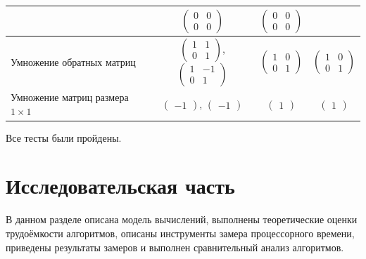 \documentclass{bmstu}
\begin{document}
\begin{table}[H]
\begin{tabularx}{\textwidth}{|p{3.5cm}|c|C|C|}
		               & $\begin{pmatrix}0&0\\0&0\end{pmatrix}$
		               & $\begin{pmatrix}0&0\\0&0\end{pmatrix}$                               \\ \hline
		Умножение обратных матриц
		               & $\begin{pmatrix}1&1\\0&1\end{pmatrix}$,
		$\begin{pmatrix}1&-1\\0&1\end{pmatrix}$
		               & $\begin{pmatrix}1&0\\0&1\end{pmatrix}$
		               & $\begin{pmatrix}1&0\\0&1\end{pmatrix}$                               \\ \hline
		Умножение матриц размера $1\times1$
		               & $\begin{pmatrix}-1\end{pmatrix}$,
		$\begin{pmatrix}-1\end{pmatrix}$
		               & $\begin{pmatrix}1\end{pmatrix}$
		               & $\begin{pmatrix}1\end{pmatrix}$                                      \\ \hline
	\end{tabularx}
\end{table}

Все тесты были пройдены.

\chapter{Исследовательская часть}

В данном разделе описана модель вычислений, выполнены теоретические оценки
трудоёмкости алгоритмов, описаны инструменты замера процессорного времени,
приведены результаты замеров и выполнен сравнительный анализ алгоритмов.
\end{document}

